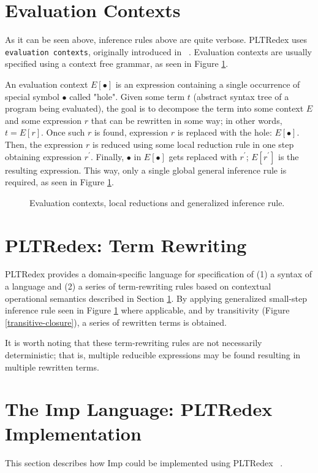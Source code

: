 \section{Evaluation Contexts}
\label{02-evaluation-context}
As it can be seen above, inference rules above are quite verbose. PLTRedex uses \texttt{evaluation contexts}, originally introduced in ~\cite{felleisen1992revised}. Evaluation contexts are usually specified using a context free grammar, as seen in Figure \ref{infer-evaluation}.

An evaluation context $E[\bullet]$ is an expression containing a single occurrence of special symbol $\bullet$ called "hole". Given some term $t$ (abstract syntax tree of a program being evaluated), the goal is to decompose the term into some context $E$ and some expression $r$ that can be rewritten in some way; in other words, $t=E[r]$. Once such $r$ is found, expression $r$ is replaced with the hole: $E[\bullet]$. Then, the expression $r$ is reduced using some local reduction rule in one step obtaining expression $r^\prime$. Finally, $\bullet$ in $E[\bullet]$ gets replaced with $r^\prime$; $E[r^\prime]$ is the resulting expression. This way, only a single global general inference rule is required, as seen in Figure \ref{infer-evaluation}. 

\begin{figure}[htbp]

\caption{Evaluation contexts, local reductions and generalized inference rule.}
\label{infer-evaluation}
\end{figure}

\section{PLTRedex: Term Rewriting}
PLTRedex provides a domain-specific language for specification of (1) a syntax of a language and (2) a series of term-rewriting rules based on contextual operational semantics described in Section \ref{02-evaluation-context}. By applying generalized small-step inference rule seen in Figure \ref{infer-evaluation} where applicable, and by transitivity (Figure \ref{transitive-closure}), a series of rewritten terms is obtained.

It is worth noting that these term-rewriting rules are not necessarily deterministic; that is, multiple reducible expressions may be found resulting in multiple rewritten terms.

\section{The Imp Language: PLTRedex Implementation}
\label{02-pltredex}
This section describes how Imp could be implemented using PLTRedex ~\cite{redexreference}. 

